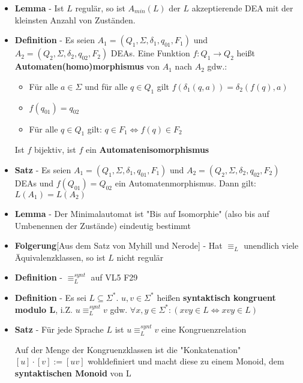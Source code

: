 \documentclass[12pt, a4paper]{article}
\begin{document}
\begin{itemize}
		\item \textbf{Lemma} - Ist $L$ regulär, so ist $A_{min}(L)$ der $L$ akzeptierende DEA mit der kleinsten Anzahl von Zuständen.
		
		\item \textbf{Definition} - Es seien $A_{1}=(Q_{1},\Sigma,\delta_{1},q_{01},F_{1})$ und $A_{2}=(Q_{2},\Sigma,\delta_{2},q_{02},F_{2})$ DEAs.
		\subitem Eine Funktion $f:Q_{1}\rightarrow Q_{2}$ heißt \textbf{Automaten(homo)morphismus} von $A_{1}$ nach $A_{2}$ gdw.:
		\begin{itemize}
			\item Für alle $a\in\Sigma$ und für alle $q\in Q_{1}$ gilt $f(\delta_{1}(q,a))=\delta_{2}(f(q),a)$
			\item $f(q_{01})=q_{02}$
			\item Für alle $q\in Q_{1}$ gilt: $q\in F_{1}\Leftrightarrow f(q)\in F_{2}$
		\end{itemize}
		\subitem Ist $f$ bijektiv, ist $f$ ein \textbf{Automatenisomorphismus}
		
		\item \textbf{Satz} - Es seien $A_{1}=(Q_{1},\Sigma,\delta_{1},q_{01},F_{1})$ und $A_{2}=(Q_{2},\Sigma,\delta_{2},q_{02},F_{2})$ DEAs und $f(Q_{01})=Q_{02}$ ein Automatenmorphismus. Dann gilt: $L(A_{1})=L(A_{2})$
		
		\item \textbf{Lemma} - Der Minimalautomat ist "Bis auf Isomorphie" (also bis auf Umbenennen der Zustände) eindeutig bestimmt
		
		\item \textbf{Folgerung}[Aus dem Satz von Myhill und Nerode] - Hat $\equiv_{L}$ unendlich viele Äquivalenzklassen, so ist $L$ nicht regulär
		
		\item \textbf{Definition} - $\equiv^{synt}_{L}$ auf VL5 F29
		
		\item \textbf{Definition} - Es sei $L\subseteq\Sigma^{*}$. $u,v\in\Sigma^{*}$ heißen \textbf{syntaktisch kongruent modulo L}, i.Z. $u\equiv^{synt}_{L}v$ gdw. $\forall x,y\in\Sigma^{*}:(xvy\in L\Leftrightarrow xvy\in L)$
		
		\item \textbf{Satz} -  Für jede Sprache $L$ ist $u\equiv^{synt}_{L}v$ eine Kongruenzrelation
		
		\subitem Auf der Menge der Kongruenzklassen ist die "Konkatenation" $[u]\cdot[v]:=[uv]$ wohldefiniert und macht diese zu einem Monoid, dem \textbf{syntaktischen Monoid} von L
		

\end{itemize}
\end{document}
